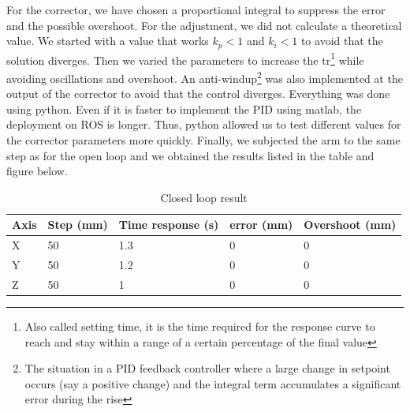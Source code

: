 For the corrector, we have chosen a proportional integral to suppress the error and the possible overshoot. For the adjustment, we did not calculate a theoretical value. We started with a value that works $k_p\less 1$ and $k_i\less 1$ to avoid that the solution diverges. Then we varied the parameters to increase the \gls{tr}\footnote{Also called setting time, it is the time required for the response curve to reach and stay within a range of a certain percentage of the final value} while avoiding oscillations and overshoot. An anti-\gls{windup}\footnote{The situation in a PID feedback controller where a large change in setpoint occurs (say a positive change) and the integral term accumulates a significant error during the rise} was also implemented at the output of the corrector to avoid that the control diverges. Everything was done using python. Even if it is faster to implement the PID using matlab, the deployment on ROS is longer. Thus, python allowed us to test different values for the corrector parameters more quickly. Finally, we subjected the arm to the same step as for the open loop and we obtained the results listed in the table and figure below.
\begin{table}[ht]
    \centering
    \begin{tabular}{|p{1cm} | p{2.3cm} | p{3.5cm} | p{2.3cm}| p{3.3cm} |} 
        \hline
        \textbf{Axis} & \textbf{Step (mm)} &\textbf{Time response (s)} & \textbf{error (mm)} & \textbf{Overshoot (mm)}\\ [0.3ex]
        \hline
        X & 50 & 1.3 & 0 & 0 \\ 
        \hline
        Y & 50 & 1.2 & 0 & 0 \\ 
        \hline
        Z & 50 & 1 & 0 & 0 \\ 
        \hline
    \end{tabular}
    \caption{Closed loop result}
\end{table}
\FloatBarrier

